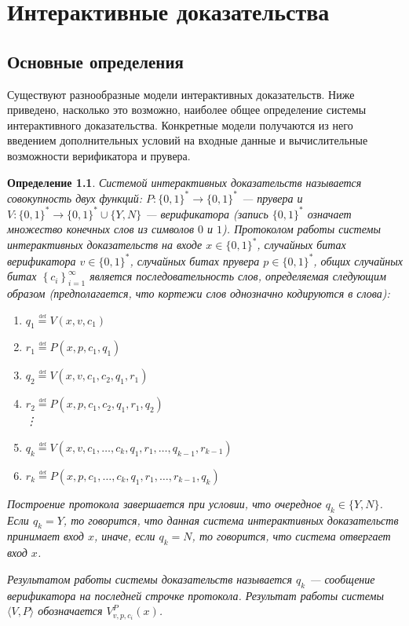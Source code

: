 \documentclass[14pt, a4paper]{extreport}
\newtheorem{definition}{\indent Определение}
\newcommand{\word}{\{0, 1\}^*}
\newcommand{\defeq}{\overset{\underset{\mathrm{def}}{}}{=}}
\begin{document}
\chapter{Интерактивные доказательства}
\section{Основные определения}
Существуют разнообразные модели интерактивных доказательств. Ниже приведено, насколько это возможно, наиболее общее определение системы интерактивного доказательства. Конкретные модели получаются из него введением дополнительных условий на входные данные и вычислительные возможности верификатора и прувера.
\begin{definition}\label{ip_system}
    Системой интерактивных доказательств называется совокупность двух функций: $P: \word \longrightarrow \word$ --- прувера и $V: \word \longrightarrow \word \cup \{Y, N\}$ --- верификатора (запись $\word$ означает множество конечных слов из символов $0$ и $1$). Протоколом работы системы интерактивных доказательств на входе $x \in \word$, случайных битах верификатора $v \in \word$, случайных битах прувера $p \in \word$, общих случайных битах $\left\{c_i\right\}_{i=1}^{\infty}$ является последовательность слов, определяемая следующим образом (предполагается, что кортежи слов однозначно кодируются в слова):
    \begin{enumerate}
        \item $q_1 \defeq V(x, v, c_1)$
        \item $r_1 \defeq P(x, p, c_1, q_1)$
        \item $q_2 \defeq V(x, v, c_1, c_2, q_1, r_1)$
        \item $r_2 \defeq P(x, p, c_1, c_2, q_1, r_1, q_2)$\\
            \vdots
        \item [(2k-1).] $q_k \defeq V(x, v, c_1, \ldots, c_k, q_1, r_1, \ldots, q_{k-1}, r_{k-1})$
        \item [(2k).] $r_k \defeq P(x, p, c_1, \ldots, c_k, q_1, r_1, \ldots, r_{k-1}, q_k)$
    \end{enumerate}
    Построение протокола завершается при условии, что очередное $q_k \in \{Y, N\}$. Если $q_k = Y$, то говорится, что данная система интерактивных доказательств принимает вход $x$, иначе, если $q_k = N$, то говорится, что система отвергает вход $x$.

    Результатом работы системы доказательств называется $q_k$ --- сообщение верификатора на последней строчке протокола. Результат работы системы $\langle V, P\rangle$ обозначается $V^{P}_{v, p, c_i}(x)$.
\end{definition}
\end{document}
